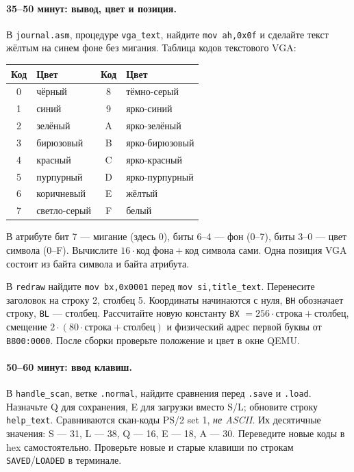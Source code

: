 \paragraph{35--50 минут: вывод, цвет и позиция.}
В \texttt{journal.asm}, процедуре \texttt{vga\_text}, найдите
\texttt{mov ah,0x0f} и сделайте текст жёлтым на синем фоне без мигания.
Таблица кодов текстового VGA:
\begin{center}\small
\begin{tabular}{|c|l|c|l|}\hline
Код & Цвет & Код & Цвет \\ \hline
0 & чёрный & 8 & тёмно-серый \\
1 & синий & 9 & ярко-синий \\
2 & зелёный & A & ярко-зелёный \\
3 & бирюзовый & B & ярко-бирюзовый \\
4 & красный & C & ярко-красный \\
5 & пурпурный & D & ярко-пурпурный \\
6 & коричневый & E & жёлтый \\
7 & светло-серый & F & белый \\ \hline
\end{tabular}\end{center}
В атрибуте бит 7 --- мигание (здесь 0), биты 6--4 --- фон
(0--7), биты 3--0 --- цвет символа (0--F). Вычислите
$16\cdot\text{код фона}+\text{код символа}$ сами. Одна позиция
VGA состоит из байта символа и байта атрибута.

В \texttt{redraw} найдите \texttt{mov bx,0x0001} перед
\texttt{mov si,title\_text}. Перенесите заголовок на строку 2,
столбец 5. Координаты начинаются с нуля, \texttt{BH} обозначает
строку, \texttt{BL} --- столбец. Рассчитайте новую константу
\texttt{BX} $=256\cdot\text{строка}+\text{столбец}$, смещение
$2\cdot(80\cdot\text{строка}+\text{столбец})$ и физический адрес
первой буквы от \texttt{B800:0000}. После сборки проверьте положение
и цвет в окне QEMU.

\paragraph{50--60 минут: ввод клавиш.}
В \texttt{handle\_scan}, ветке \texttt{.normal}, найдите сравнения
перед \texttt{.save} и \texttt{.load}. Назначьте Q для сохранения,
E для загрузки вместо S/L; обновите строку \texttt{help\_text}.
Сравниваются скан-коды PS/2 set 1, \emph{не ASCII}. Их десятичные
значения: S --- 31, L --- 38, Q --- 16, E --- 18, A --- 30.
Переведите новые коды в hex самостоятельно. Проверьте новые и старые
клавиши по строкам \texttt{SAVED}/\texttt{LOADED} в терминале.

